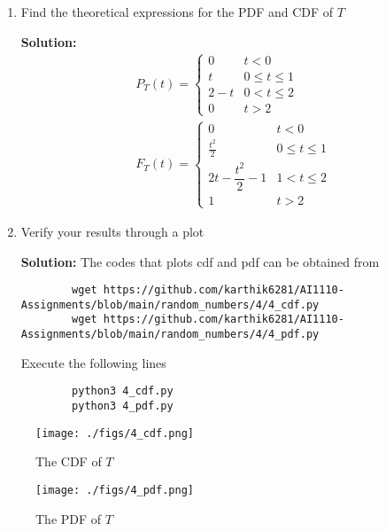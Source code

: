 \documentclass[journal,12pt,twocolumn]{IEEEtran}
\newcommand{\solution}{\noindent \textbf{Solution: }}
\numberwithin{equation}{section}
\renewcommand\thesection{\arabic{section}}
\begin{document}
\begin{enumerate}[label=\thesection.\arabic*,ref=\thesection.\theenumi]
\begin{enumerate}[label=\thesection.\arabic*,ref=\thesection.\theenumi]
	\item Find the theoretical expressions for the PDF and CDF of $T$
	
	\solution 
\begin{align}
P_{T}(t)=
\begin{cases}
0 & t<0\\
t & 0\leq t \leq 1\\
2-t  & 0< t \leq 2\\
0 & t>2 
\end{cases} 
\\   
F_{T}(t)=
\begin{cases}
0 & t<0\\
\frac{t^2}{2} & 0\leq t \leq 1\\
2t -\dfrac{t^2}{2} - 1  & 1< t \leq 2\\
1 & t>2
\end{cases}
\end{align}
	\item Verify your results through a plot
	
	\solution The codes that plots cdf and pdf can be obtained from
	\begin{lstlisting}
		wget https://github.com/karthik6281/AI1110-Assignments/blob/main/random_numbers/4/4_cdf.py
		wget https://github.com/karthik6281/AI1110-Assignments/blob/main/random_numbers/4/4_pdf.py
	\end{lstlisting}
	Execute the following lines
	\begin{lstlisting}
		python3 4_cdf.py
		python3 4_pdf.py
	\end{lstlisting}
	
	
	\end{enumerate}
	\end{enumerate}
	\begin{figure}
		\centering
		\texttt{[image: ./figs/4\_cdf.png]}
		\caption{The CDF of $T$}
	\end{figure}
	
	\begin{figure}
		\centering
		\texttt{[image: ./figs/4\_pdf.png]}
		\caption{The PDF of $T$}
	\end{figure}		
	
\end{document}
